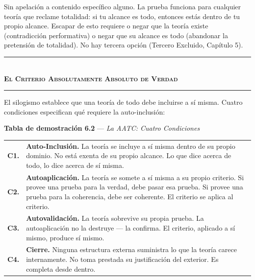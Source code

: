 \documentclass[10pt, openany, oneside]{book}
\renewcommand{\normalsize}{\fontsize{10}{13}\selectfont}
\renewcommand{\footnotesize}{\fontsize{8.5}{11}\selectfont}
\begin{document}
\vspace{0.8em}

\noindent Sin apelación a contenido específico alguno. La prueba funciona para cualquier teoría que reclame totalidad: si tu alcance es todo, entonces estás dentro de tu propio alcance. Escapar de esto requiere o negar que la teoría existe (contradicción performativa) o negar que su alcance es todo (abandonar la pretensión de totalidad). No hay tercera opción (Tercero Excluido, Capítulo 5).

\vspace{1.5em}


\begin{center}
    \rule{0.3\textwidth}{0.4pt}\\[0.5em]
    {\normalsize\bfseries\scshape El Criterio Absolutamente Absoluto de Verdad}\\[0.3em]
    \rule{0.3\textwidth}{0.4pt}
\end{center}

\vspace{1em}

\noindent El silogismo establece que una teoría de todo debe incluirse a sí misma. Cuatro condiciones especifican qué requiere la auto-inclusión:

\vspace{0.5em}

\textbf{Tabla de demostración 6.2} --- \textit{La AATC: Cuatro Condiciones}

\vspace{0.5em}

{\footnotesize
\noindent\begin{tabular}{r p{}}
\textbf{C1.} & \textbf{Auto-Inclusión.} La teoría se incluye a sí misma dentro de su propio dominio. No está exenta de su propio alcance. Lo que dice acerca de todo, lo dice acerca de sí misma. \\[0.3em]
\textbf{C2.} & \textbf{Autoaplicación.} La teoría se somete a sí misma a su propio criterio. Si provee una prueba para la verdad, debe pasar esa prueba. Si provee una prueba para la coherencia, debe ser coherente. El criterio se aplica al criterio. \\[0.3em]
\textbf{C3.} & \textbf{Autovalidación.} La teoría sobrevive su propia prueba. La autoaplicación no la destruye --- la confirma. El criterio, aplicado a sí mismo, produce sí mismo. \\[0.3em]
\textbf{C4.} & \textbf{Cierre.} Ninguna estructura externa suministra lo que la teoría carece internamente. No toma prestada su justificación del exterior. Es completa desde dentro. \\[0.3em]
\end{tabular}
}
\end{document}

